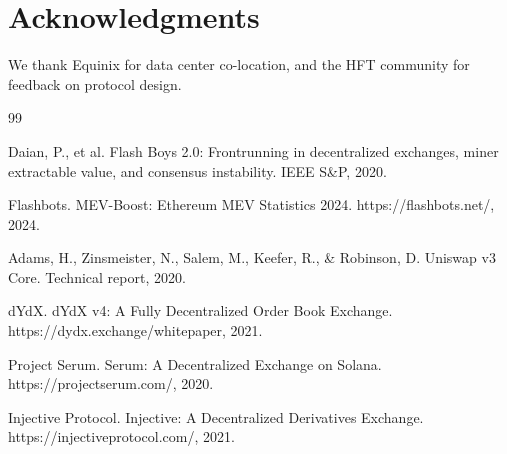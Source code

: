\section*{Acknowledgments}


We thank Equinix for data center co-location, and the HFT community for feedback on protocol design.


\begin{thebibliography}{99}

Daian, P., et al. Flash Boys 2.0: Frontrunning in decentralized exchanges, miner extractable value, and consensus instability. IEEE S\&P, 2020.

Flashbots. MEV-Boost: Ethereum MEV Statistics 2024. https://flashbots.net/, 2024.

Adams, H., Zinsmeister, N., Salem, M., Keefer, R., \& Robinson, D. Uniswap v3 Core. Technical report, 2020.

dYdX. dYdX v4: A Fully Decentralized Order Book Exchange. https://dydx.exchange/whitepaper, 2021.

Project Serum. Serum: A Decentralized Exchange on Solana. https://projectserum.com/, 2020.

Injective Protocol. Injective: A Decentralized Derivatives Exchange. https://injectiveprotocol.com/, 2021.

\end{thebibliography}

